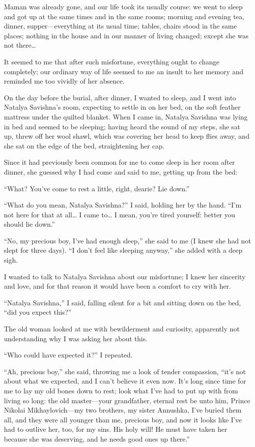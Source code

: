 Maman was already gone, and our life took its usually course: we went to sleep and got up at the same times and in the same rooms; morning and evening tea, dinner, supper---everything at its usual time; tables, chairs stood in the same places; nothing in the house and in our manner of living changed; except she was not there\ldots{}

It seemed to me that after such misfortune, everything ought to change completely; our ordinary way of life seemed to me an insult to her memory and reminded me too vividly of her absence.

On the day before the burial, after dinner, I wanted to sleep, and I went into Natalya Savishna's room, expecting to settle in on her bed, on the soft feather mattress under the quilted blanket. When I came in, Natalya Savishna was lying in bed and seemed to be sleeping; having heard the sound of my steps, she sat up, threw off her wool shawl, which was covering her head to keep flies away, and she sat on the edge of the bed, straightening her cap. 

Since it had previously been common for me to come sleep in her room after dinner, she guessed why I had come and said to me, getting up from the bed:

``What? You've come to rest a little, right, dearie? Lie down.'' %

``What do you mean, Natalya Savishna?'' I said, holding her by the hand. ``I'm not here for that at all\ldots{} I came to\ldots{} I mean, you're tired yourself: better you should lie down.'' %

``No, my precious boy, I've had enough sleep,'' she said to me (I knew she had not slept for three days). ``I don't feel like sleeping anyway,'' she added with a deep sigh. %

I wanted to talk to Natalya Savishna about our misfortune; I knew her sincerity and love, and for that reason it would have been a comfort to cry with her.

``Natalya Savishna,'' I said, falling silent for a bit and sitting down on the bed, ``did you expect this?'' %

The old woman looked at me with bewilderment and curiosity, apparently not understanding why I was asking her about this.

``Who could have expected it?'' I repeated. %

``Ah, precious boy,'' she said, throwing me a look of tender compassion, ``it's not about what we expected, and I can't believe it even now. It's long since time for me to lay my old bones down to rest; look what I've had to put up with from living so long: the old master---your grandfather, eternal rest be unto him, Prince Nikolai Mikhaylovich---my two brothers, my sister Annushka, I've buried them all, and they were all younger than me, precious boy, and now it looks like I've had to outlive her, too, for my sins. His holy will! He must have taken her because she was deserving, and he needs good ones up there.'' %

